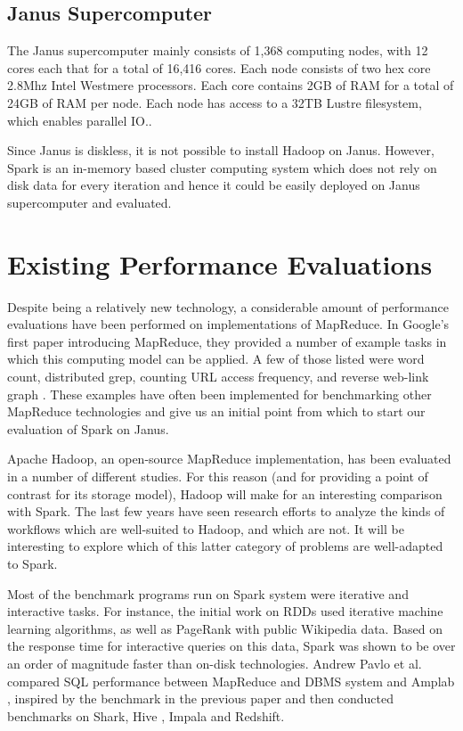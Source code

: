 \documentclass{article}
\begin{document}
\subsection*{Janus Supercomputer}
The Janus supercomputer mainly consists of 1,368 computing nodes, with  12 cores
each that for a total of 16,416 cores. Each node consists of two hex core
2.8Mhz Intel Westmere processors. Each core contains 2GB of RAM for a total of
24GB of RAM per node. Each node has access to a 32TB Lustre filesystem, which
enables parallel IO.\citep{tufo}. 

Since Janus is diskless, it is not possible to install Hadoop on Janus.
However, Spark is an in-memory based cluster computing system which does not
rely on disk data for every iteration and hence it could be easily deployed on
Janus supercomputer and evaluated.

\section*{Existing Performance Evaluations }
Despite being a relatively new technology, a considerable amount of performance
evaluations have been performed on implementations of MapReduce.
In Google's first paper introducing MapReduce, they provided a number of
example tasks in which this computing model can be applied. A few of those listed were
word count, distributed grep, counting URL access frequency, and reverse web-link
graph \citep{dean-mapreduce}. These examples have often been implemented for
benchmarking other MapReduce technologies and give us an initial point from which
to start our evaluation of Spark on Janus.

Apache Hadoop, an open-source MapReduce implementation, has been evaluated in a
number of different studies. For this reason (and for providing a point of
contrast for its storage model), Hadoop will make for an interesting comparison
with Spark. The last few years have seen research efforts to analyze the 
kinds of workflows which are well-suited to Hadoop, and which are not. \citep{yanpei}
It will be interesting to explore which of this latter category of problems are
well-adapted to Spark.

Most of the benchmark programs run on Spark system were iterative and
interactive tasks. For instance, the initial work on RDDs \citep{zaharia_rdd}
used iterative machine learning algorithms, as well as PageRank with public
Wikipedia data. Based on the response time for interactive queries on
this data, Spark was shown to be over an order of magnitude faster than
on-disk technologies.
Andrew Pavlo et al. \cite{andrew} compared SQL performance between
MapReduce and DBMS system and Amplab \citep{amplab_bench}, inspired by the
benchmark in the previous paper and then conducted benchmarks on Shark,
Hive \citep{ashish}, Impala and Redshift.
\end{document}
